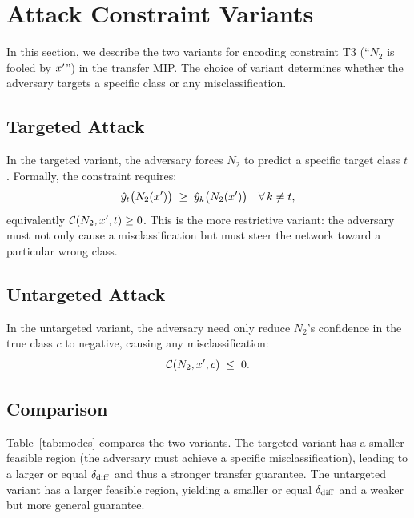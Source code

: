 \section{Attack Constraint Variants}
\label{sec:modes}

In this section, we describe the two variants for encoding constraint T3 (``$N_2$ is fooled by $x'$'') in the transfer MIP. The choice of variant determines whether the adversary targets a specific class or any misclassification.

\subsection{Targeted Attack}

In the targeted variant, the adversary forces $N_2$ to predict a specific target class $t$. Formally, the constraint requires:
\begin{equation}
  \label{eq:ctarget}
  \hat{y}_t\bigl(N_2(x')\bigr) \;\ge\; \hat{y}_k\bigl(N_2(x')\bigr)
  \quad \forall\, k \neq t,
\end{equation}
equivalently $\mathcal{C}(N_2,x',t) \ge 0$. This is the more restrictive variant: the adversary must not only cause a misclassification but must steer the network toward a particular wrong class.

\subsection{Untargeted Attack}

In the untargeted variant, the adversary need only reduce $N_2$'s confidence in the true class $c$ to negative, causing any misclassification:
\begin{equation}
  \label{eq:ctag}
  \mathcal{C}(N_2,x',c) \;\le\; 0.
\end{equation}

\subsection{Comparison}

Table~\ref{tab:modes} compares the two variants. The targeted variant has a smaller feasible region (the adversary must achieve a specific misclassification), leading to a larger or equal $\delta_{\mathrm{diff}}$ and thus a stronger transfer guarantee. The untargeted variant has a larger feasible region, yielding a smaller or equal $\delta_{\mathrm{diff}}$ and a weaker but more general guarantee.

